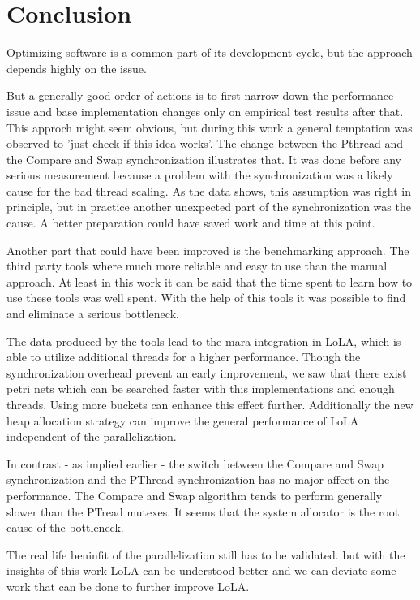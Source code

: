 \chapter{Conclusion}
Optimizing software is a common part of its development cycle, but the approach depends highly on the issue.

But a generally good order of actions is to first narrow down the performance issue and base implementation changes only on empirical test results after that. This approch might seem obvious, but during this work a general temptation was observed to 'just check if this idea works'. The change between the Pthread and the Compare and Swap synchronization illustrates that. It was done before any serious measurement because a problem with the synchronization was a likely cause for the bad thread scaling. As the data shows, this assumption was right in principle, but in practice another unexpected part of the synchronization was the cause. A better preparation could have saved work and time at this point.

Another part that could have been improved is the benchmarking approach. The third party tools where much more reliable and easy to use than the manual approach. At least in this work it can be said that the time spent to learn how to use these tools was well spent. With the help of this tools it was possible to find and eliminate a serious bottleneck.

The data produced by the tools lead to the mara integration in LoLA, which is able to utilize additional threads for a higher performance. Though the synchronization overhead prevent an early improvement, we saw that there exist petri nets which can be searched faster with this implementations and enough threads. Using more buckets can enhance this effect further. Additionally the new heap allocation strategy can improve the general performance of LoLA independent of the parallelization.

In contrast - as implied earlier - the switch between the Compare and Swap synchronization and the PThread synchronization has no major affect on the performance. The Compare and Swap algorithm tends to perform generally slower than the PTread mutexes. It seems that the system allocator is the root cause of the bottleneck.

The real life beninfit of the parallelization still has to be validated. but with the insights of this work LoLA can be understood better and we can deviate some work that can be done to further improve LoLA. 